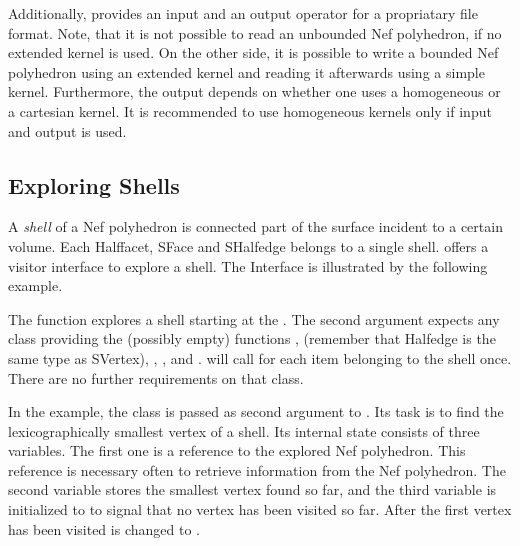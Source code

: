 
Additionally,  provides an input and an output operator 
for a propriatary file format. Note, that it is not possible to read an unbounded
Nef polyhedron, if no extended kernel is used. On the other side, it is
possible to write a bounded Nef polyhedron using an extended kernel and 
reading it afterwards using a simple kernel. Furthermore, the output depends
on whether one uses a homogeneous or a cartesian kernel. It is recommended 
to use homogeneous kernels only if input and output is used.


\subsection{Exploring Shells}

A \emph{shell} of a Nef polyhedron is connected part of the surface incident
to a certain volume. Each Halffacet, SFace and SHalfedge belongs to a single
shell.  offers a visitor interface to explore a shell.
The Interface is illustrated by the following example.


The function  
explores a shell starting at the . The second argument expects any
class providing the (possibly empty) functions ,
 (remember that Halfedge is the same type as
SVertex), 
, , 
 and . 
 will call  for each item belonging
to the shell once. There are no further requirements on that class. 

In the example, the class  is passed as second argument
to . Its task is to find the lexicographically
smallest vertex of a shell. Its internal state consists of three variables. 
The first one is a reference to the explored Nef polyhedron. This reference
is necessary often to retrieve information from the Nef polyhedron. The
second variable  stores the smallest vertex found so far, and
the third variable  is initialized to  to signal that no
vertex has been visited so far. After the first vertex has been visited 
 is changed to .

